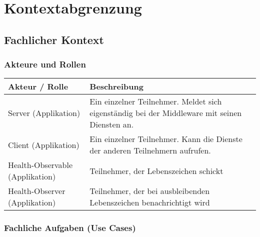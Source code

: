 \chapter{Kontextabgrenzung}


\section{Fachlicher Kontext}


\subsection{Akteure und Rollen}

\begin{tabular}{|p{4cm}|p{10cm}|}
	\hline
	\textbf{Akteur / Rolle} & \textbf{Beschreibung} \\
	\hline
	Server (Applikation) & Ein einzelner Teilnehmer. Meldet sich eigenständig bei der Middleware mit seinen Diensten an. \\
	\hline
	Client (Applikation) & Ein einzelner Teilnehmer. Kann die Dienste der anderen Teilnehmern aufrufen. \\
	\hline
	Health-Observable (Applikation) & Teilnehmer, der Lebenszeichen schickt \\
	\hline
	Health-Observer (Applikation) & Teilnehmer, der bei ausbleibenden Lebenszeichen benachrichtigt wird  \\
	\hline
\end{tabular}

\subsection{Fachliche Aufgaben (Use Cases)}

